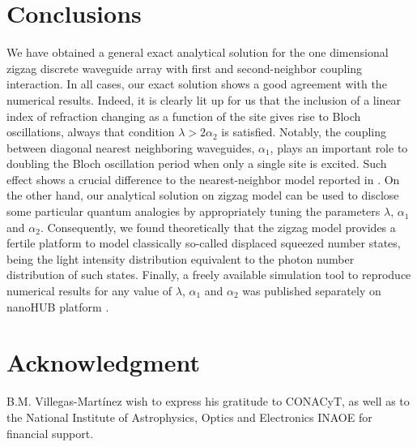 \documentclass[12pt]{article}
\numberwithin{equation}{section}
\begin{document}
\section{Conclusions}
We have obtained a general exact analytical solution for the one dimensional zigzag discrete waveguide array with first and second-neighbor coupling interaction. In all cases, our exact solution shows a good agreement with the numerical results. Indeed, it is clearly lit up for us that the inclusion of a linear index of refraction changing as a function of the site gives rise to Bloch oscillations, always that condition $\lambda>2\alpha_{2}$ is satisfied. Notably, the coupling between diagonal nearest neighboring waveguides, $\alpha_{1}$, plays an important role  to doubling the Bloch oscillation period when only a single site is excited. Such effect shows a crucial difference to the nearest-neighbor model reported in \cite{13A}. On the other hand, our analytical solution on zigzag model can be used to disclose some particular quantum analogies by appropriately tuning the parameters $\lambda$, $\alpha_{1}$ and $\alpha_{2}$. Consequently, we found theoretically that the zigzag model provides a fertile platform to model classically so-called displaced squeezed number states, being the light intensity distribution equivalent to the photon number distribution of such states. Finally, a freely available simulation tool to reproduce numerical results for any value of $\lambda$, $\alpha_{1}$ and $\alpha_{2}$ was published separately on nanoHUB platform \cite{32}.

\section{Acknowledgment}
B.M. Villegas-Martínez wish to express his gratitude to CONACyT, as well as to the National Institute of Astrophysics, Optics and Electronics INAOE for financial support.

\appendix 
\end{document}
